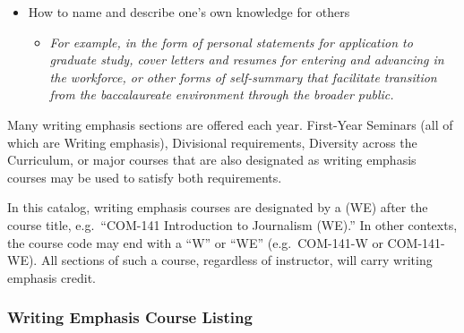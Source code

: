 \documentclass[
  letterpaper,
]{scrbook}
\providecommand{\tightlist}{%
  \setlength{\itemsep}{0pt}\setlength{\parskip}{0pt}}
\begin{document}
\begin{itemize}
\begin{itemize}
    \begin{itemize}
    \tightlist
    \item
      \emph{For deepening knowledge, thinking through questions and
      problems, and reflecting on connections and growth}
    \end{itemize}
  \item
    How to name and describe one's own knowledge for others

    \begin{itemize}
    \tightlist
    \item
      \emph{For example, in the form of personal statements for
      application to graduate study, cover letters and resumes for
      entering and advancing in the workforce, or other forms of
      self-summary that facilitate transition from the baccalaureate
      environment through the broader public.}
    \end{itemize}
  \end{itemize}
\end{itemize}

Many writing emphasis sections are offered each year. First-Year
Seminars (all of which are Writing emphasis), Divisional requirements,
Diversity across the Curriculum, or major courses that are also
designated as writing emphasis courses may be used to satisfy both
requirements.

In this catalog, writing emphasis courses are designated by a (WE) after
the course title, e.g.~``COM-141 Introduction to Journalism (WE).'' In
other contexts, the course code may end with a ``W'' or ``WE''
(e.g.~COM-141-W or COM-141-WE). All sections of such a course,
regardless of instructor, will carry writing emphasis credit.

\subsubsection{Writing Emphasis Course
Listing}\label{writing-emphasis-course-listing}
\end{document}
